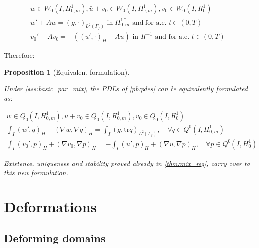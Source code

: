\documentclass[english,a4paper,10pt,oneside]{scrbook}	%
\theoremstyle{break}
\newtheorem{prop}[equation]{Proposition}
\theoremstyle{remark}
\newcommand{\tr}{\text{tr}}
\begin{document}
\begin{appendices}
\begin{align*}
w \in W_0(I, H^1_{0,m}),\bar{u}+v_0 \in W_0(I,H^1_{0,m}), v_0 \in W_0(I,H^1_0)\\
w' + A w = (g,\cdot)_{L^2(\Gamma_f)} \text{ in }H^{1*}_{0,m} \text{ and for a.e. } t \in (0,T) \\
v_0' + A v_0 = -((\bar{u}',\cdot)_H+A \bar{u}) \text{ in }H^{-1} \text{ and for a.e. } t \in (0,T) 
\end{align*}

Therefore:

\begin{prop}[Equivalent formulation]
\label{prop:eq_form}

Under \cref{ass:basic_par_mix}, the PDEs of \cref{pb:pdes} can be equivalently formulated as:

\begin{align*}
w \in Q_0(I, H^1_{0,m}), \bar{u}+v_0 \in Q_0(I,H^1_{0,m}), v_0 \in Q_0(I,H^1_0) \\
\int_I ( w' , q)_H+ (\nabla w, \nabla q)_H = \int_I(g,\tr q)_{L^2(\Gamma_f)}, \quad \forall q \in Q^0(I, H^1_{0,m}) \\
\int_I (v_0',p)_H + (\nabla v_0, \nabla p)_H= -\int_I(\bar{u}',p)_H+(\nabla \bar{u}, \nabla p)_H, \quad \forall p \in Q^0(I, H^1_0) 
\end{align*}

Existence, uniqueness and stability proved already in  \cref{thm:mix_reg}, carry over to this new formulation.

\end{prop}

\chapter{Deformations}
\label{chap:domain_transformations}
\section{Deforming domains}


\end{appendices}
\end{document}
